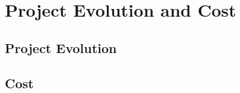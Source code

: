 \chapter{Project Evolution and Cost}
\label{chap:evolution}

\section{Project Evolution}


\section{Cost}

